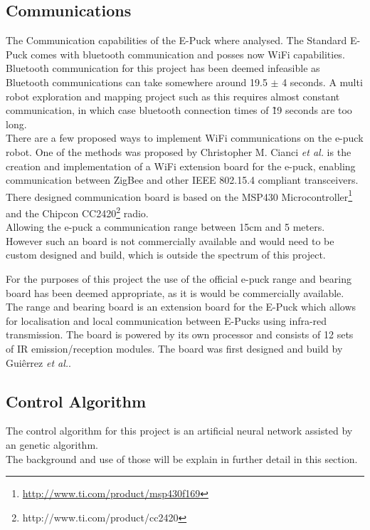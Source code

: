 \subsection{Communications}
The Communication capabilities of the E-Puck where analysed. The Standard E-Puck comes  with bluetooth communication and posses now WiFi capabilities. \\
Bluetooth  communication for this project has been deemed infeasible as Bluetooth communications can take somewhere around 19.5 $\pm$ 4 seconds. A multi robot exploration and mapping project such as this requires almost constant communication, in which case bluetooth connection times of \~19 seconds are too long.\\

There are a few proposed ways to implement WiFi communications on the e-puck robot. 
One of the methods was proposed by Christopher M. Cianci \textit{et al.}\cite{Cianci2007Communication} is the creation and implementation of a WiFi extension board for the e-puck, enabling communication between ZigBee and other IEEE 802.15.4 compliant transceivers. \\
There designed communication board is based on the MSP430 Microcontroller\footnote{\url{http://www.ti.com/product/msp430f169}} and the Chipcon CC2420\footnote{http://www.ti.com/product/cc2420} radio.\\
Allowing the e-puck a communication range between 15cm and 5 meters. \\
However such an board is not commercially available and would need to be custom designed and build, which is outside the spectrum of this project.

For the purposes of this project the use of the official e-puck range and bearing board has been deemed appropriate, as it is would be commercially available.\\
The range and bearing board is an extension board for the E-Puck which allows for localisation and local communication between E-Pucks using infra-red transmission. 
The board is powered by its own processor and consists of 12 sets of IR emission/reception modules. 
The board was first designed and build by Guiêrrez \textit{et al.}\cite{Gutierrez}. 

\subsection{Control Algorithm}
The control algorithm for this project is an artificial neural network assisted by an genetic algorithm.\\
The background and use of those will be explain in further detail in this section.

